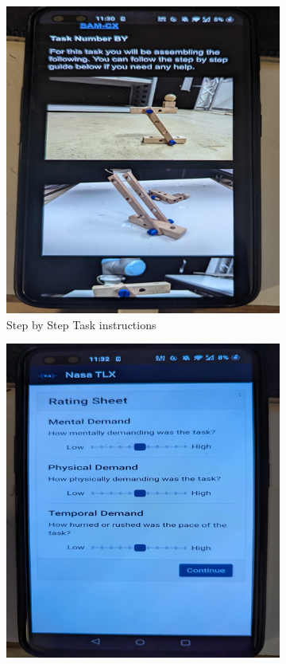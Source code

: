 \begin{figure}[h]
    \centering
    \begin{subfigure}[b]{0.45\columnwidth}
        \includegraphics[width=\textwidth]{images/phonetask1.png}
        \caption{Step by Step Task instructions}
        \label{fig:phone1}
    \end{subfigure}
    \begin{subfigure}[b]{0.45\columnwidth}
        \includegraphics[width=\textwidth]{images/phonetlx1.png}

\end{subfigure}
\end{figure}
